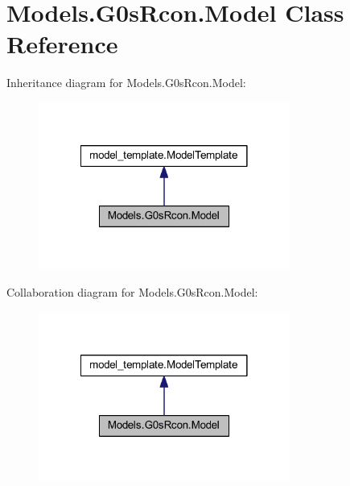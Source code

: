 \hypertarget{class_models_1_1_g0s_rcon_1_1_model}{\section{Models.\-G0s\-Rcon.\-Model Class Reference}
\label{class_models_1_1_g0s_rcon_1_1_model}
}


Inheritance diagram for Models.\-G0s\-Rcon.\-Model\-:
\nopagebreak
\begin{figure}[H]
\begin{center}
\leavevmode
\includegraphics[width=234pt]{class_models_1_1_g0s_rcon_1_1_model__inherit__graph}
\end{center}
\end{figure}


Collaboration diagram for Models.\-G0s\-Rcon.\-Model\-:
\nopagebreak
\begin{figure}[H]
\begin{center}
\leavevmode
\includegraphics[width=234pt]{class_models_1_1_g0s_rcon_1_1_model__coll__graph}
\end{center}
\end{figure}
